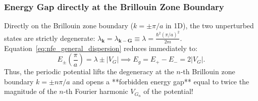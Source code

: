 \documentclass[11pt,a4paper]{article}
\newcommand{\abs}[1]{\left|#1\right|}
\newcommand{\hb}{\hbar}
\newcommand{\hbarsq}{\hb^2}
\newcommand{\kk}{\mathbf{k}}
\newcommand{\GG}{\mathbf{G}}
\begin{document}
\subsubsection{Energy Gap directly at the Brillouin Zone Boundary}
Directly on the Brillouin zone boundary ($k = \pm \pi/a$ in 1D), the two unperturbed states are strictly degenerate: $\lambda_{\kk} = \lambda_{\kk-\GG} \equiv \lambda = \frac{\hbarsq(\pi/a)^2}{2m}$. Equation~\eqref{eq:nfe_general_dispersion} reduces immediately to:
\begin{equation}
    E_\pm\left(\frac{\pi}{a}\right) = \lambda \pm \abs{V_G} \implies \boxed{E_g = E_+ - E_- = 2\abs{V_G}.}
    \label{eq:nfe_gap_master}
\end{equation}
Thus, the periodic potential lifts the degeneracy at the $n$-th Brillouin zone boundary $k = \pm n\pi/a$ and opens a **forbidden energy gap** equal to twice the magnitude of the $n$-th Fourier harmonic $V_{G_n}$ of the potential!
\end{document}
